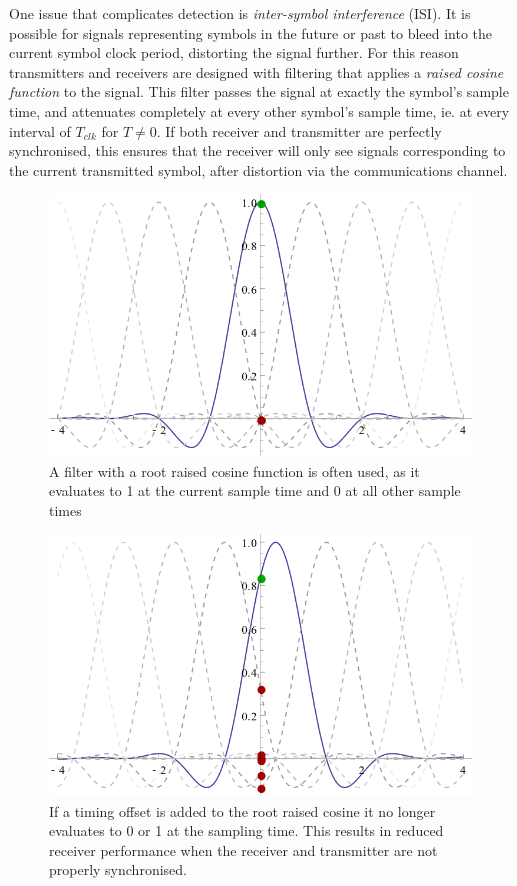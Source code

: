 One issue that complicates detection is \emph{inter-symbol
interference} (ISI). It is possible for signals representing symbols in
the future or past to bleed into the current symbol clock period,
distorting the signal further. For this reason transmitters and receivers
are designed with filtering that applies a \emph{raised cosine function} to the signal.
This filter passes the signal at exactly the symbol's sample time, and attenuates
completely at every other symbol's sample time, ie. at every interval of
$T_{clk}$ for $T \neq 0$. If both receiver and transmitter are perfectly
synchronised, this ensures that the receiver will only see signals
corresponding to the current transmitted symbol, after distortion via
the communications channel.

\begin{figure}[htbp]
\centering
\includegraphics[width=\linewidth]{rrc_sync.png}
\caption[Synchronized raised-cosine response]{A filter with a root raised cosine function is often used, as
it evaluates to 1 at the current sample time and 0 at all other sample
times}
\end{figure}

\begin{figure}[htbp]
\centering
\includegraphics[width=\linewidth]{rrc_err.png}
\caption[Unsynchronized raised-cosine response]{If a timing offset is added to the root raised cosine it no
longer evaluates to 0 or 1 at the sampling time. This results in
reduced receiver performance when the receiver and transmitter are not
properly synchronised.}
\end{figure}

